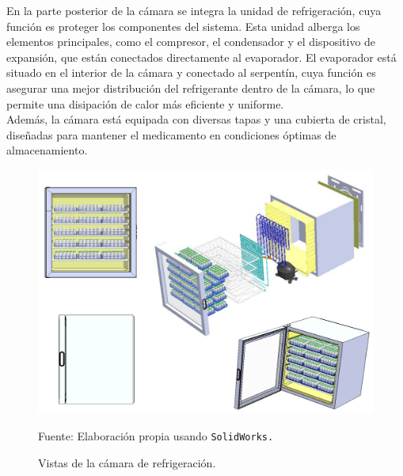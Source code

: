 En la parte posterior de la cámara se integra la unidad de refrigeración, cuya función es proteger los componentes del sistema. Esta unidad alberga los elementos principales, como el compresor, el condensador y el dispositivo de expansión, que están conectados directamente al evaporador. El evaporador está situado en el interior de la cámara y conectado al serpentín, cuya función es asegurar una mejor distribución del refrigerante dentro de la cámara, lo que permite una disipación de calor más eficiente y uniforme.\\
Además, la cámara está equipada con diversas tapas y una cubierta de cristal, diseñadas para mantener el medicamento en condiciones óptimas de almacenamiento.
  
  \begin{figure}[H]
 	\centering
 	\includegraphics[width=0.8\linewidth]{figures/4-propuesta_sol}
 	\caption{Vistas de la cámara de refrigeración.}
 	Fuente: Elaboración propia usando \texttt{SolidWorks.}
 	\label{fig:4-propuestasol}
 \end{figure}
 

